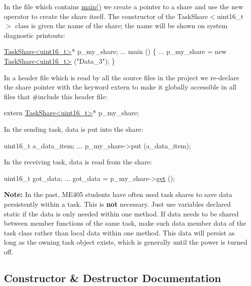 In the file which contains {\ttfamily \mbox{\hyperlink{main_8cpp_a840291bc02cba5474a4cb46a9b9566fe}{main()}}} we create a pointer to a share and use the {\ttfamily new} operator to create the share itself. The constructor of the {\ttfamily Task\+Share$<$uint16\+\_\+t$>$} class is given the name of the share; the name will be shown on system diagnostic printouts\+: 
\begin{DoxyCode}
\mbox{\hyperlink{class_task_share}{TaskShare<uint16\_t>}}* p\_my\_share;
...
main ()
\{
    ...
    p\_my\_share = \textcolor{keyword}{new} \mbox{\hyperlink{class_task_share}{TaskShare<uint16\_t>}} (\textcolor{stringliteral}{"Data\_3"});
\}
\end{DoxyCode}
 In a header file which is read by all the source files in the project we re-\/declare the share pointer with the keyword {\ttfamily extern} to make it globally accessible in all files that {\ttfamily \#include} this header file\+: 
\begin{DoxyCode}
\textcolor{keyword}{extern} \mbox{\hyperlink{class_task_share}{TaskShare<uint16\_t>}}* p\_my\_share;
\end{DoxyCode}
 In the sending task, data is put into the share\+: 
\begin{DoxyCode}
uint16\_t a\_data\_item;
...
p\_my\_share->put (a\_data\_item);
\end{DoxyCode}
 In the receiving task, data is read from the share\+: 
\begin{DoxyCode}
uint16\_t got\_data;
...
got\_data = p\_my\_share->\mbox{\hyperlink{class_task_share_a0cf8afd4f4d90c1e91ff2af9a004ecec}{get}} ();
\end{DoxyCode}


{\bfseries Note\+:} In the past, M\+E405 students have often used task shares to save data persistently within a task. This is {\bfseries not} necessary. Just use variables declared {\ttfamily static} if the data is only needed within one method. If data needs to be shared between member functions of the same task, make such data member data of the task class rather than local data within one method. This data will persist as long as the owning task object exists, which is generally until the power is turned off. 

\subsection{Constructor \& Destructor Documentation}
\mbox{\label{class_task_share_a9e49e43c6da3859b9690a62ad64d7f40}} 
